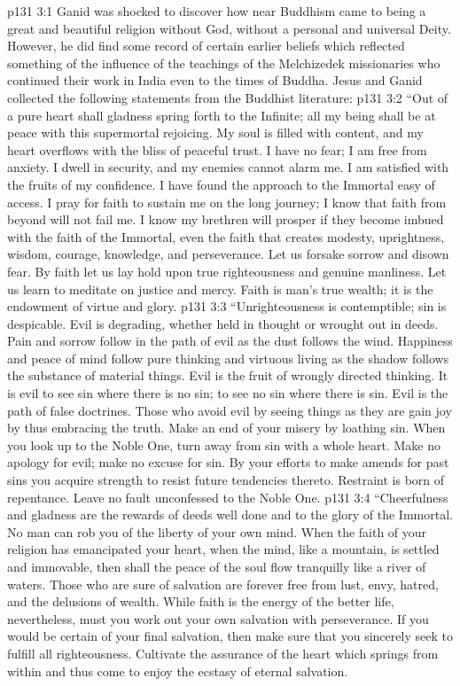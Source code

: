 \vs p131 3:1 Ganid was shocked to discover how near Buddhism came to being a great and beautiful religion without God, without a personal and universal Deity. However, he did find some record of certain earlier beliefs which reflected something of the influence of the teachings of the Melchizedek missionaries who continued their work in India even to the times of Buddha. Jesus and Ganid collected the following statements from the Buddhist literature:
\pc \vs p131 3:2 “Out of a pure heart shall gladness spring forth to the Infinite; all my being shall be at peace with this supermortal rejoicing. My soul is filled with content, and my heart overflows with the bliss of peaceful trust. I have no fear; I am free from anxiety. I dwell in security, and my enemies cannot alarm me. I am satisfied with the fruits of my confidence. I have found the approach to the Immortal easy of access. I pray for faith to sustain me on the long journey; I know that faith from beyond will not fail me. I know my brethren will prosper if they become imbued with the faith of the Immortal, even the faith that creates modesty, uprightness, wisdom, courage, knowledge, and perseverance. Let us forsake sorrow and disown fear. By faith let us lay hold upon true righteousness and genuine manliness. Let us learn to meditate on justice and mercy. Faith is man’s true wealth; it is the endowment of virtue and glory.
\vs p131 3:3 “Unrighteousness is contemptible; sin is despicable. Evil is degrading, whether held in thought or wrought out in deeds. Pain and sorrow follow in the path of evil as the dust follows the wind. Happiness and peace of mind follow pure thinking and virtuous living as the shadow follows the substance of material things. Evil is the fruit of wrongly directed thinking. It is evil to see sin where there is no sin; to see no sin where there is sin. Evil is the path of false doctrines. Those who avoid evil by seeing things as they are gain joy by thus embracing the truth. Make an end of your misery by loathing sin. When you look up to the Noble One, turn away from sin with a whole heart. Make no apology for evil; make no excuse for sin. By your efforts to make amends for past sins you acquire strength to resist future tendencies thereto. Restraint is born of repentance. Leave no fault unconfessed to the Noble One.
\vs p131 3:4 “Cheerfulness and gladness are the rewards of deeds well done and to the glory of the Immortal. No man can rob you of the liberty of your own mind. When the faith of your religion has emancipated your heart, when the mind, like a mountain, is settled and immovable, then shall the peace of the soul flow tranquilly like a river of waters. Those who are sure of salvation are forever free from lust, envy, hatred, and the delusions of wealth. While faith is the energy of the better life, nevertheless, must you work out your own salvation with perseverance. If you would be certain of your final salvation, then make sure that you sincerely seek to fulfill all righteousness. Cultivate the assurance of the heart which springs from within and thus come to enjoy the ecstasy of eternal salvation.
